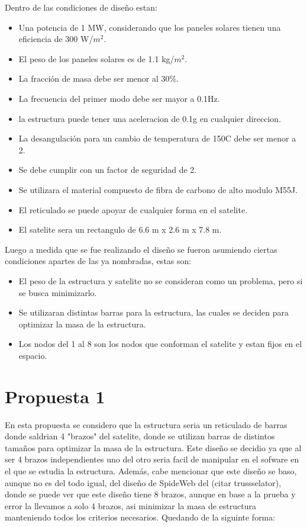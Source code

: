 Dentro de las condiciones de diseño estan:

\begin{itemize}
    \item Una potencia de 1 MW, considerando que los paneles solares tienen una eficiencia de 300 W/$m^2$.
    \item El peso de los paneles solares es de 1.1 kg/$m^2$.
    \item La fracción de masa debe ser menor al 30\%.
    \item La frecuencia del primer modo debe ser mayor a 0.1Hz.
    \item la estructura puede tener una aceleracion de 0.1g en cualquier direccion.
    \item La desangulación para un cambio de temperatura de 150\textdegree{}C debe ser menor a 2\textdegree.
    \item Se debe cumplir con un factor de seguridad de 2.
    \item Se utilizara el material compuesto de fibra de carbono de alto modulo M55J.
    \item El reticulado se puede apoyar de cualquier forma en el satelite.
    \item El satelite sera un rectangulo de 6.6 m x 2.6 m x 7.8 m.
\end{itemize}

Luego a medida que se fue realizando el diseño se fueron asumiendo ciertas condiciones apartes de las ya nombradas, estas son:

\begin{itemize}
    \item El peso de la estructura y satelite no se consideran como un problema, pero si se busca minimizarlo.
    \item Se utilizaran distintas barras para la estructura, las cuales se deciden para optimizar la masa de la estructura.
    \item Los nodos del 1 al 8 son los nodos que conforman el satelite y estan fijos en el espacio.
\end{itemize}

\newpage
\section{Propuesta 1}

En esta propuesta se considero que la estructura seria un reticulado de barras donde saldrian 4 "brazos" del satelite, donde se utilizan barras de distintos tamaños para optimizar la masa de la estructura. Este diseño se decidio ya que al ser 4 brazos independientes uno del otro seria facil de manipular en el sofware en el que se estudia la estructura. Además, cabe mencionar que este diseño se baso, aunque no es del todo igual, del diseño de SpideWeb del (citar trussselator), donde se puede ver que este diseño tiene 8 brazos, aunque en base a la prueba y error la llevamos a solo 4 brazos, asi minimizar la masa de estructura manteniendo todos los criterios necesarios. Quedando de la siguinte forma: 

